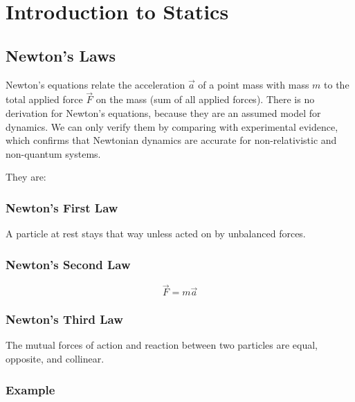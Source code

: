 \section{Introduction to Statics}

\subsection{Newton's Laws}



Newton's equations relate the acceleration $\vec{a}$ of a point mass with mass $m$ to the total applied force $\vec{F}$ on the mass (sum of all applied forces). There is no derivation for Newton's equations, because they are an assumed model for dynamics. We can only verify them by comparing with experimental evidence, which confirms that Newtonian dynamics are accurate for non-relativistic and non-quantum systems.

They are:

\subsubsection{Newton's First Law}

A particle at rest stays that way unless acted on by unbalanced forces. 

\subsubsection{Newton's Second Law}

\[\vec{F} = m \vec{a}\]

\subsubsection{Newton's Third Law}

The mutual forces of action and reaction between two particles are equal, opposite, and collinear. 

\subsubsection{Example}

